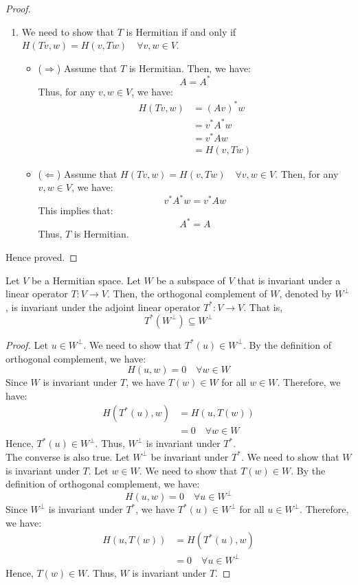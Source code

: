 \documentclass[openany]{book}
\begin{document}
\begin{proof}
\begin{enumerate}
        \item We need to show that $T$ is Hermitian if and only if $H(Tv, w) = H(v, Tw) \quad \forall v, w \in V$.
        \begin{itemize}
            \item ($\Rightarrow$) Assume that $T$ is Hermitian. Then, we have:
            $$A = A^*$$
            Thus, for any $v, w \in V$, we have:
            \[\begin{aligned}
            H(Tv, w) &= (Av)^* w \\
            &= v^* A^* w \\
            &= v^* A w \\
            &= H(v, Tw)
            \end{aligned}\]
            
            \item ($\Leftarrow$) Assume that $H(Tv, w) = H(v, Tw) \quad \forall v, w \in V$. Then, for any $v, w \in V$, we have:
            $$v^* A^* w = v^* A w$$
            This implies that:
            $$A^* = A$$
            Thus, $T$ is Hermitian.
        \end{itemize}
    \end{enumerate}
    Hence proved. 
\end{proof}
\begin{mytheorem}
Let $V$ be a Hermitian space. Let $W$ be a subspace of $V$ that is invariant under a linear operator $T: V \to V$. Then, the orthogonal complement of $W$, denoted by $W^\perp$, is invariant under the adjoint linear operator $T^*: V \to V$. That is,
$$T^*(W^\perp) \subseteq W^\perp$$
\end{mytheorem}
\begin{proof}
Let $u \in W^\perp$. We need to show that $T^*(u) \in W^\perp$. By the definition of orthogonal complement, we have:
$$H(u, w) = 0 \quad \forall w \in W$$
Since $W$ is invariant under $T$, we have $T(w) \in W$ for all $w \in W$. Therefore, we have:
\[\begin{aligned}
H(T^*(u), w) &= H(u, T(w)) \\
&= 0 \quad \forall w \in W
\end{aligned}\]
Hence, $T^*(u) \in W^\perp$. Thus, $W^\perp$ is invariant under $T^*$. \\
The converse is also true. Let $W^\perp$ be invariant under $T^*$. We need to show that $W$ is invariant under $T$. Let $w \in W$. We need to show that $T(w) \in W$. By the definition of orthogonal complement, we have:
$$H(u, w) = 0 \quad \forall u \in W^\perp$$
Since $W^\perp$ is invariant under $T^*$, we have $T^*(u) \in W^\perp$ for all $u \in W^\perp$. Therefore, we have:
\[\begin{aligned}
H(u, T(w)) &= H(T^*(u), w) \\
&= 0 \quad \forall u \in W^\perp
\end{aligned}\]
Hence, $T(w) \in W$. Thus, $W$ is invariant under $T$.
\end{proof}
\end{document}
